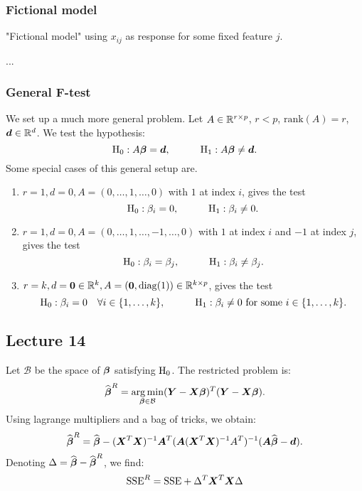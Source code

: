 \subsubsection*{Fictional model}
"Fictional model" using $x_{ij}$ as response for some fixed feature $j$. 




... \TODO

\subsubsection*{General F-test}


We set up a much more general problem. Let $A\in\mathbb{R}^{r\times p}$, $r<p$, $\mathrm{rank}(A)=r$, $\boldsymbol{d}\in\mathbb{R}^d$. We test the hypothesis:
$$
    \mathrm{H}_0 : A\boldsymbol{\beta} = \boldsymbol{d}, 
    \quad\quad\quad
    \mathrm{H}_1 : A\boldsymbol{\beta} \ne \boldsymbol{d}.
$$
Some special cases of this general setup are.
\begin{enumerate}
    \item $r=1, d=0, A=(0, \dots, 1, \dots, 0)$ with $1$ at index $i$, gives the test 
    $$
        \mathrm{H}_0 : \beta_i = 0, 
        \quad\quad\quad
        \mathrm{H}_1 : \beta_i \ne 0.
    $$
    \item $r=1, d=0, A=(0, \dots, 1, \dots, -1, \dots, 0)$ with $1$ at index $i$ and $-1$ at index $j$, gives the test 
    $$
        \mathrm{H}_0 : \beta_i = \beta_j,
        \quad\quad\quad
        \mathrm{H}_1 : \beta_i \ne \beta_j.
    $$
    \item $r=k, d=\boldsymbol{0}\in\mathbb{R}^k, A=(\boldsymbol{0}, \mathrm{diag}(1))\in\mathbb{R}^{k\times p}$, gives the test 
    $$
        \mathrm{H}_0 : \beta_i = 0 \quad\forall i\in\{1,\dots,k\},
        \quad\quad\quad
        \mathrm{H}_1 : \beta_i \ne 0 \textrm{ for some } i\in\{1,\dots,k\}.
    $$
\end{enumerate}

\subsection*{Lecture 14}

Let $\mathcal{B}$ be the space of $\boldsymbol{\beta}$ satisfying $\mathrm{H}_0$. The restricted problem is:
$$
    \widehat{\boldsymbol{\beta}}^R = \operatorname*{arg\,min}_{\boldsymbol{\beta}\in\mathcal{B}}(\boldsymbol{Y}-\boldsymbol{X}\boldsymbol{\beta})^T(\boldsymbol{Y}-\boldsymbol{X}\boldsymbol{\beta}).
$$
Using lagrange multipliers and a bag of tricks, we obtain:
$$
    \widehat{\boldsymbol{\beta}}^R = \widehat{\boldsymbol{\beta}} - (\boldsymbol{X}^T\boldsymbol{X})^{-1}\boldsymbol{A}^T(\boldsymbol{A}(\boldsymbol{X}^T\boldsymbol{X})^{-1}A^T)^{-1}(\boldsymbol{A}\widehat{\boldsymbol{\beta}}-\boldsymbol{d}).
$$
Denoting $\Delta = \widehat{\boldsymbol{\beta}}-\widehat{\boldsymbol{\beta}}^R$, we find:
$$
    \mathrm{SSE}^R = \mathrm{SSE} + \Delta^T\boldsymbol{X}^T\boldsymbol{X}\Delta
$$

